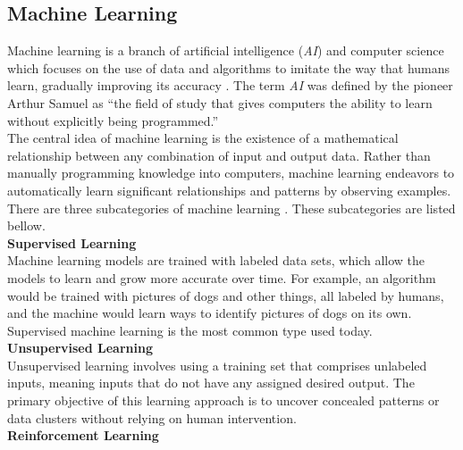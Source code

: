 \newpage

\subsection{Machine Learning}

Machine learning is a branch of artificial intelligence (\textit{AI}) and computer science which focuses on the use of data and algorithms to imitate the way that humans learn, gradually improving its accuracy \cite{IBMMachineLearning}. The term \textit{AI} was defined by the pioneer Arthur Samuel as “the field of study that gives computers the ability to learn without explicitly being programmed.” \\

The central idea of machine learning is the existence of a mathematical relationship between any combination of input and output data. Rather than manually programming knowledge into computers, machine learning endeavors to automatically learn significant relationships and patterns by observing examples. \\

There are three subcategories of machine learning \cite{MITML}. These subcategories are listed bellow. \\

\vspace{0.5cm}
\textbf{Supervised Learning} \\
    
Machine learning models are trained with labeled data sets, which allow the models to learn and grow more accurate over time. For example, an algorithm would be trained with pictures of dogs and other things, all labeled by humans, and the machine would learn ways to identify pictures of dogs on its own. Supervised machine learning is the most common type used today. \\

\vspace{0.5cm}
\textbf{Unsupervised Learning} \\

Unsupervised learning involves using a training set that comprises unlabeled inputs, meaning inputs that do not have any assigned desired output. The primary objective of this learning approach is to uncover concealed patterns or data clusters without relying on human intervention. \\

\vspace{0.5cm}
\textbf{Reinforcement Learning} \\

